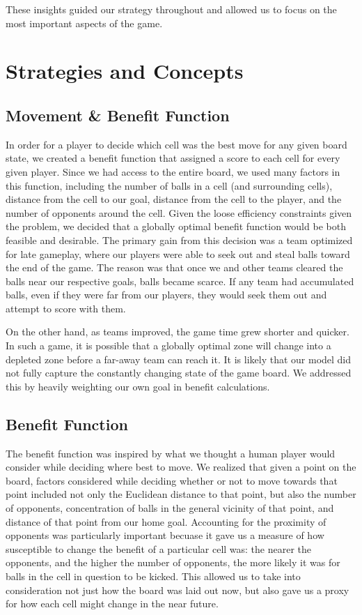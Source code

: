 \documentclass[
10pt, %
letterpaper, %
oneside, %
headinclude,footinclude, %
english
]{article}
\begin{document}
These insights guided our strategy throughout and allowed us to focus on the most important aspects of the game.

\section{Strategies and Concepts}

\subsection {Movement \& Benefit Function}

In order for a player to decide which cell was the best move for any given board state, we created a benefit function that assigned a score to each cell for every given player. Since we had access to the entire board, we used many factors in this function, including the number of balls in a cell (and surrounding cells), distance from the cell to our goal, distance from the cell to the player, and the number of opponents around the cell. Given the loose efficiency constraints given the problem, we decided that a globally optimal benefit function would be both feasible and desirable. The primary gain from this decision was a team optimized for late gameplay, where our players were able to seek out and steal balls toward the end of the game. The reason was that once we and other teams cleared the balls near our respective goals, balls became scarce. If any team had accumulated balls, even if they were far from our players, they would seek them out and attempt to score with them.

On the other hand, as teams improved, the game time grew shorter and quicker. In such a game, it is possible that a globally optimal zone will change into a depleted zone before a far-away team can reach it. It is likely that our model did not fully capture the constantly changing state of the game board. We addressed this by heavily weighting our own goal in benefit calculations.

\subsection{Benefit Function}
The benefit function was inspired by what we thought a human player would consider while deciding where best to move. We realized that given a point on the board, factors considered while deciding whether or not to move towards that point included not only the Euclidean distance to that point, but also the number of opponents, concentration of balls in the general vicinity of that point, and distance of that point from our home goal. Accounting for the proximity of opponents was particularly important becuase it gave us a measure of how susceptible to change the benefit of a particular cell was: the nearer the opponents, and the higher the number of opponents, the more likely it was for balls in the cell in question to be kicked. This allowed us to take into consideration not just how the board was laid out now, but also gave us a proxy for how each cell might change in the near future.
\end{document}
